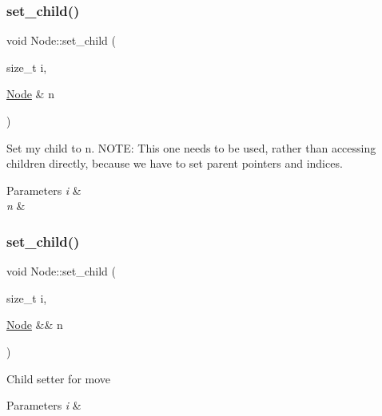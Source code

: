 \mbox{\label{class_node_afff50c3712b8e30fffd479cad4eee023}} 
\subsubsection{\texorpdfstring{set\+\_\+child()}{set\_child()}\hspace{0.1cm}{\footnotesize\ttfamily [1/2]}}
{\footnotesize\ttfamily void Node\+::set\+\_\+child (\begin{DoxyParamCaption}\item[{size\+\_\+t}]{i,  }\item[{\hyperlink{class_node}{Node} \&}]{n }\end{DoxyParamCaption})\hspace{0.3cm}{\ttfamily [inline]}}

Set my child to n. N\+O\+TE\+: This one needs to be used, rather than accessing children directly, because we have to set parent pointers and indices. 
\begin{DoxyParams}{Parameters}
{\em i} & \\
\hline
{\em n} & \\
\hline
\end{DoxyParams}
\mbox{\label{class_node_a486882370d2c9592c6eabb52a3289253}} 
\subsubsection{\texorpdfstring{set\+\_\+child()}{set\_child()}\hspace{0.1cm}{\footnotesize\ttfamily [2/2]}}
{\footnotesize\ttfamily void Node\+::set\+\_\+child (\begin{DoxyParamCaption}\item[{size\+\_\+t}]{i,  }\item[{\hyperlink{class_node}{Node} \&\&}]{n }\end{DoxyParamCaption})\hspace{0.3cm}{\ttfamily [inline]}}

Child setter for move 
\begin{DoxyParams}{Parameters}
{\em i} & \\
\hline
\end{DoxyParams}
\mbox{\label{class_node_a1a6f6c8062e66046c302a80cc7e8d817}} 
